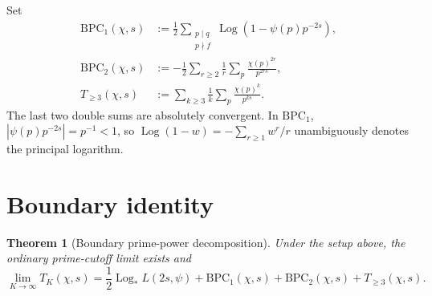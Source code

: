 \documentclass[11pt]{article}
\newtheorem{theorem}{Theorem}
\DeclareMathOperator{\Log}{Log}
\begin{document}
Set
\begin{align}
 \mathrm{BPC}_1(\chi,s)
   &:=\frac12\sum_{\substack{p\mid q\\p\nmid f}}
       \Log\!\left(1-\psi(p)p^{-2s}\right),\\
 \mathrm{BPC}_2(\chi,s)
   &:=-\frac12\sum_{r\ge2}\frac1r\sum_p
       \frac{\chi(p)^{2r}}{p^{2rs}},\\
 T_{\ge3}(\chi,s)
   &:=\sum_{k\ge3}\frac1k\sum_p
       \frac{\chi(p)^k}{p^{ks}}.
\end{align}
The last two double sums are absolutely convergent.  In $\mathrm{BPC}_1$,
$|\psi(p)p^{-2s}|=p^{-1}<1$, so $\Log(1-w)=-\sum_{r\ge1}w^r/r$
unambiguously denotes the principal logarithm.

\section{Boundary identity}

\begin{theorem}[Boundary prime-power decomposition]\label{thm:boundary}
Under the setup above, the ordinary prime-cutoff limit exists and
\begin{equation}\label{eq:boundary}
 \lim_{K\to\infty}T_K(\chi,s)
 =\frac12\Log_* L(2s,\psi)
  +\mathrm{BPC}_1(\chi,s)
  +\mathrm{BPC}_2(\chi,s)
  +T_{\ge3}(\chi,s).
\end{equation}
\end{theorem}
\end{document}

